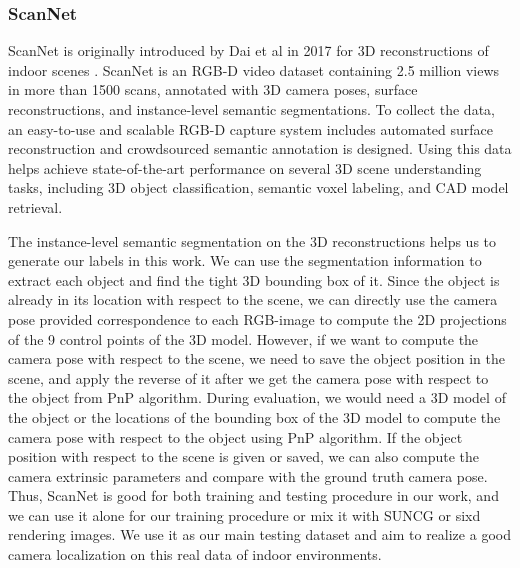\subsubsection{ScanNet}
ScanNet is originally introduced by Dai et al in 2017 for 3D reconstructions of indoor scenes \cite{dai2017scannet}. ScanNet is an RGB-D video dataset containing 2.5 million views in more than 1500 scans, annotated with 3D camera poses, surface reconstructions, and instance-level semantic segmentations. To collect the data, an easy-to-use and scalable RGB-D capture system includes automated surface reconstruction and crowdsourced semantic annotation is designed. Using this data helps achieve state-of-the-art performance on several 3D scene understanding tasks, including 3D object classification, semantic voxel labeling, and CAD model retrieval.

The instance-level semantic segmentation on the 3D reconstructions helps us to generate our labels in this work. We can use the segmentation information to extract each object and find the tight 3D bounding box of it. Since the object is already in its location with respect to the scene, we can directly use the camera pose provided correspondence to each RGB-image to compute the 2D projections of the 9 control points of the 3D model. However, if we want to compute the camera pose with respect to the scene, we need to save the object position in the scene, and apply the reverse of it after we get the camera pose with respect to the object from PnP algorithm. During evaluation, we would need a 3D model of the object or the locations of the bounding box of the 3D model to compute the camera pose with respect to the object using PnP algorithm. If the object position with respect to the scene is given or saved, we can also compute the camera extrinsic parameters and compare with the ground truth camera pose. Thus, ScanNet is good for both training and testing procedure in our work, and we can use it alone for our training procedure or mix it with SUNCG or sixd rendering images. We use it  as our main testing dataset and aim to realize a good camera localization on this real data of indoor environments.

